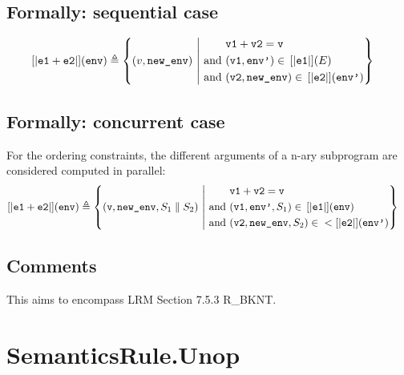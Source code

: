 \documentclass{book}
\begin{document}
\begin{formal}
  \subsection{Formally: sequential case}
  
  \begin{align}
  \left[| \texttt{e1} + \texttt{e2} \right|] (\texttt{env}) & \triangleq
    \left\{ (v, \texttt{new\_env}) \ \middle|\ {}
    \begin{aligned}
      & \texttt{v1} + \texttt{v2} = \texttt{v}
      \\ \text{and}\ &
      (\texttt{v1}, \texttt{env'}) \in{} \left[| \texttt{e1} \right|] (E)
      \\ \text{and}\ &
      (\texttt{v2}, \texttt{new\_env}) \in{} \left[| \texttt{e2} \right|] (\texttt{env'})
    \end{aligned}
    \right\}
  \label{eq:sem-seq-plus}
  \end{align} 

  \subsection{Formally: concurrent case}
  For the ordering constraints, the different arguments of a n-ary subprogram
are considered computed in parallel:
  \begin{align}
    \left[| \texttt{e1} + \texttt{e2} \right|] (\texttt{env}) & \triangleq
    \left\{ (\texttt{v}, \texttt{new\_env}, S_1 \parallel S_2) \ \middle|\ {}
    \begin{aligned}
      & \texttt{v1} + \texttt{v2} = \texttt{v}
      \\ \text{and}\ &
      (\texttt{v1}, \texttt{env'}, S_1) \in{} \left[| \texttt{e1} \right|] (\texttt{env})
      \\ \text{and}\ &
      (\texttt{v2}, \texttt{new\_env}, S_2) \in{} <\left[| \texttt{e2} \right|] (\texttt{env'})
    \end{aligned}
    \right\}
  \label{eq:sem-conc-plus}
  \end{align} 
\end{formal}

\subsection{Comments}
  This aims to encompass LRM Section 7.5.3 R\_BKNT.

\section{SemanticsRule.Unop \label{sec:SemanticsRule.Unop}}
\end{document}
